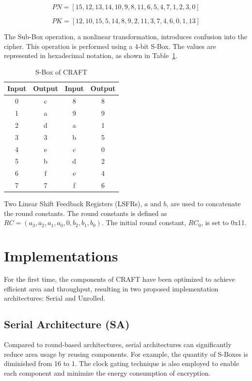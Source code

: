 \documentclass[final,5p,times,twocolumn]{elsarticle}
\begin{document}
\begin{equation}
    PN=[15,12,13,14,10,9,8,11,6,5,4,7,1,2,3,0]
    \label{permute_nibb_eq}
\end{equation}

\begin{equation}
    PK=[12,10,15,5,14,8,9,2,11,3,7,4,6,0,1,13]
    \label{key_schedule_eq}
\end{equation}

The Sub-Box operation, a nonlinear transformation, introduces confusion into the cipher.
This operation is performed using a 4-bit S-Box. The values are represented in hexadecimal notation, as shown in Table~\ref{tab4}.

\begin{table}[h]
    \centering
    \caption{S-Box of CRAFT}\label{tab4}%
    \begin{tabular}{|c|c|c|c|}
        \hline
        Input & Output & Input & Output \\
        \hline
        0     & c      & 8     & 8      \\
        1     & a      & 9     & 9      \\
        2     & d      & a     & 1      \\
        3     & 3      & b     & 5      \\
        4     & e      & c     & 0      \\
        5     & b      & d     & 2      \\
        6     & f      & e     & 4      \\
        7     & 7      & f     & 6      \\
        \hline
    \end{tabular}
\end{table}

Two Linear Shift Feedback Registers (LSFRs), $a$ and $b$, are used to concatenate the round constants.
The round constants is defined as $RC=(a_3,a_2,a_1,a_0,0,b_2,b_1,b_0)$. The initial round constant, $RC_0$, is set to 0x11.

\section{Implementations}\label{sec3}

For the first time, the components of CRAFT have been optimized to achieve efficient area and throughput, resulting in two proposed implementation architectures: Serial and Unrolled.


\subsection{Serial Architecture (SA)}\label{subsec2}
Compared to round-based architectures, serial architectures can significantly reduce area usage by reusing components.
For example, the quantity of S-Boxes is diminished from 16 to 1.
The clock gating technique is also employed to enable each component and minimize the energy consumption of encryption.
\end{document}
